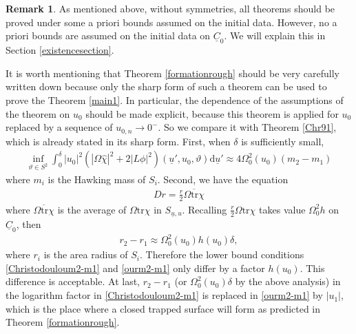 \documentclass[11pt,reqno]{amsart}
\theoremstyle{definition}
\newtheorem{remark}{Remark}[section]
\numberwithin{equation}{section}
\newcommand{\D}{\mathrm{d}}
\newcommand{\tr}{\mathrm{tr}}
\def\chih{\widehat{\chi}}
\def\tr{\mathrm{tr}}
\def\ub{\underline{u}}
\def\Cb{\underline{C}}
\begin{document}
\begin{remark}
As mentioned above, without symmetries, all theorems should be proved under some a priori bounds assumed on the initial data. However, no a priori bounds are assumed on the initial data on $\Cb_0$. We will explain this in Section \ref{existencesection}.
\end{remark}

It is worth mentioning that Theorem \ref{formationrough} should be very carefully written down because only the sharp form of such a theorem can be used to prove the Theorem \ref{main1}. In particular, the dependence of the assumptions of the theorem on $u_0$ should be made explicit, because this theorem is applied for $u_0$ replaced by a sequence of $u_{0,n}\to0^-$. So we compare it with Theorem \ref{Chr91}, which is already stated in its sharp form. First, when $\delta$ is sufficiently small,
\begin{align*}
\inf_{\vartheta\in S^2}\int_0^{\delta}|u_0|^2(|\Omega\chih|^2+2|L\phi|^2)(\ub',u_0,\vartheta)\D\ub'\approx 4\Omega_0^2(u_0)(m_2-m_1)
\end{align*}
where $m_i$ is the Hawking mass of $S_i$.  Second, we have the equation
\begin{align*}
Dr=\frac{r}{2}\overline{\Omega\tr\chi}
\end{align*}
where $\overline{\Omega\tr\chi}$ is the average of $\Omega\tr\chi$ in $S_{\ub,u}$. Recalling $\frac{r}{2}\Omega\tr\chi$ takes value $\Omega_0^2h$ on $\Cb_0$, then
\begin{align*}
r_2-r_1\approx\Omega_0^2(u_0)h(u_0)\delta,
\end{align*}
where $r_i$ is the area radius of $S_i$. Therefore the lower bound conditions \eqref{Christodouloum2-m1} and \eqref{ourm2-m1} only differ by a factor $h(u_0)$. This difference is acceptable. %
At last, $r_2-r_1$ (or $\Omega_0^2(u_0)\delta$ by the above analysis) in the logarithm factor in \eqref{Christodouloum2-m1} is replaced in  \eqref{ourm2-m1} by $|u_1|$, which is the place where a closed trapped surface will form as predicted in Theorem \ref{formationrough}. 
\end{document}
